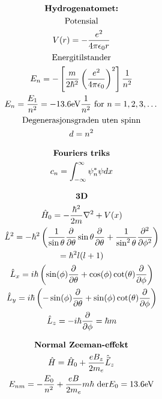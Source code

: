 \documentclass[8pt, A4paper, norsk]{extarticle}
\begin{document}
\begin{multicols*}{3}
		\begin{gather*}
\text{\textbf{Hydrogenatomet:}} \\
\text{Potensial} \\
V(r) = - \frac{e^2}{4 \pi \epsilon_0 r} \\
\text{Energitilstander} \\
E_n = - \left[ \frac{m}{2 \hbar^2} \left( \frac{e^2}{4 \pi \epsilon_0} \right)^2 \right] \frac{1}{n^2} \\
E_n = \frac{E_1}{n^2} = - 13.6 \text{eV} \frac{1}{n^2} \text{ for $n = 1, 2, 3, \dots$} \\
\text{Degenerasjonsgraden uten spinn} \\
d = n^2
		\end{gather*}

		\begin{gather*}
\text{\textbf{Fouriers triks}} \\
c_n = \int_{- \infty}^{\infty} \psi_n^{*} \psi dx
		\end{gather*}

		\begin{gather*}
\text{$\boldsymbol{3}$\textbf{D}} \\
\hat{H}_0 = - \frac{\hbar^2}{2m} \nabla^2 + V(x) \\
\hat{L}^2 = - \hbar^2 \left( \frac{1}{\sin\theta} \frac{\partial}{\partial \theta} \sin \theta \frac{\partial}{\partial \theta} + \frac{1}{\sin^2 \theta} \frac{\partial^2}{\partial \phi^2} \right) \\
= \hbar^2 l(l + 1) \\
\hat{L}_x = i \hbar \left( \sin(\phi) \frac{\partial}{\partial \theta} + \cos(\phi) \cot(\theta) \frac{\partial}{\partial \phi} \right) \\
\hat{L}_y = i \hbar \left( - \sin(\phi) \frac{\partial}{\partial \theta} + \sin(\phi) \cot(\theta) \frac{\partial}{\partial \phi} \right) \\
\hat{L}_z = - i \hbar \frac{\partial}{\partial \phi} = \hbar m
		\end{gather*}

		\begin{gather*}
\text{\textbf{Normal Zeeman-effekt}} \\
\hat{H} = \hat{H}_0 + \frac{e B_z}{2 m_e} \hat{\vec{L}}_z \\
E_{nm} = - \frac{E_0}{n^2} + \frac{e B}{2 m_e} m \hbar \text{ der} E_0 = 13.6 \text{eV}
		\end{gather*}


\end{multicols*}
\end{document}
